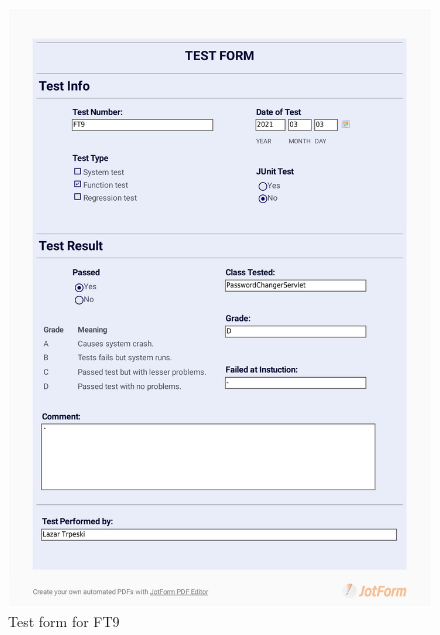 \documentclass{article}
\begin{document}
 \begin{figure}
     \centering
     \includegraphics[width=13cm]{images/2021-03-03_Lazar_FT9-1}
     \renewcommand\figurename{Figure}
     \caption{Test form for FT9}
     \label{fig:my_label}
 \end{figure}
 
\end{document}
